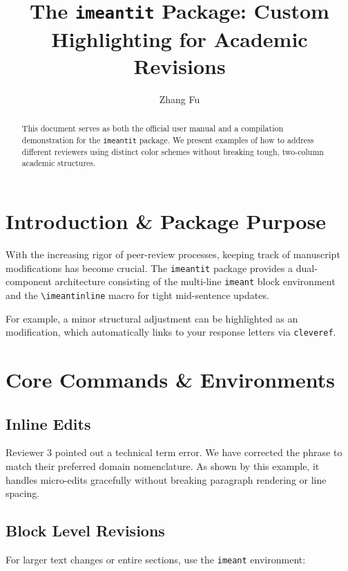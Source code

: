 \documentclass[10pt,journal,compsoc,twocolumn]{IEEEtran}
\begin{document}
\title{The \texttt{imeantit} Package: Custom Highlighting for Academic Revisions}
\author{Zhang Fu}
\maketitle

\begin{abstract}
This document serves as both the official user manual and a compilation demonstration for the \texttt{imeantit} package. We present examples of how to address different reviewers using distinct color schemes without breaking tough, two-column academic structures.
\end{abstract}

\section{Introduction \& Package Purpose}
With the increasing rigor of peer-review processes, keeping track of manuscript modifications has become crucial. The \texttt{imeantit} package provides a dual-component architecture consisting of the multi-line \texttt{imeant} block environment and the \texttt{\textbackslash imeantinline} macro for tight mid-sentence updates.

For example, a minor structural adjustment can be highlighted as an  modification, which automatically links to your response letters via \texttt{cleveref}.

\section{Core Commands \& Environments}

\subsection{Inline Edits}
Reviewer 3 pointed out a technical term error. We have corrected the phrase 
to match their preferred domain nomenclature. As shown by this example, it handles micro-edits gracefully without breaking paragraph rendering or line spacing.

\subsection{Block Level Revisions}
For larger text changes or entire sections, use the \texttt{imeant} environment:
\end{document}

